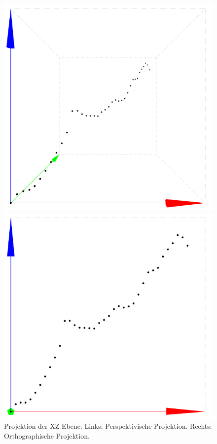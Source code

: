 \begin{figure}[!htbp]
	\centering
	\begin{minipage}{.45\textwidth}
		\includegraphics[width=\linewidth]{images/persp}
	\end{minipage}
	\begin{minipage}{.45\textwidth}
		\includegraphics[width=\linewidth]{images/ortho}
	\end{minipage}
	\caption[Projektion der XZ-Ebene]{Projektion der XZ-Ebene. Links: Perspektivische Projektion. Rechts: Orthographische Projektion.}
	\label{fig:projections}
\end{figure}


